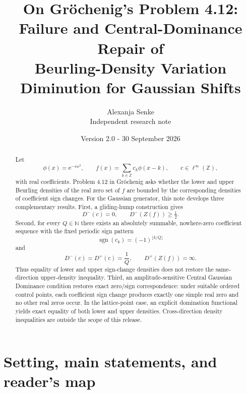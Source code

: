 \documentclass[11pt]{article}
\title{\bfseries On Gr\"ochenig's Problem 4.12:\\[0.25em]
Failure and Central-Dominance Repair of\\
Beurling-Density Variation Diminution for Gaussian Shifts}
\author{Alexanja Senke\\\small Independent research note}
\date{Version 2.0 - 30 September 2026}
\newcommand{\Z}{\mathbb{Z}}
\newcommand{\N}{\mathbb{N}}
\newcommand{\e}{\mathrm{e}}
\newcommand{\sgn}{\operatorname{sgn}}
\begin{document}
\maketitle

\begin{center}
\end{center}

\begin{abstract}
Let
\[
  \phi(x)=\e^{-\pi x^2},\qquad
  f(x)=\sum_{k\in\Z}c_k\phi(x-k),\qquad c\in\ell^\infty(\Z),
\]
with real coefficients. Problem 4.12 in Gr\"ochenig asks whether the lower and upper Beurling densities of the real zero set of $f$ are bounded by the corresponding densities of coefficient sign changes. For the Gaussian generator, this note develops three complementary results. First, a gliding-hump construction gives
\[
  D^-(c)=0,\qquad D^-(Z(f))\ge \tfrac12.
\]
Second, for every $Q\in\N$ there exists an absolutely summable, nowhere-zero coefficient sequence with the fixed periodic sign pattern
\[
  \sgn(c_k)=(-1)^{\lfloor k/Q\rfloor}
\]
and
\[
  D^-(c)=D^+(c)=\frac1Q,\qquad D^+(Z(f))=\infty.
\]
Thus equality of lower and upper sign-change densities does not restore the same-direction upper-density inequality. Third, an amplitude-sensitive Central Gaussian Dominance condition restores exact zero/sign correspondence: under suitable ordered control points, each coefficient sign change produces exactly one simple real zero and no other real zeros occur. In the lattice-point case, an explicit domination functional yields exact equality of both lower and upper densities. Cross-direction density inequalities are outside the scope of this release.
\end{abstract}

\section{Setting, main statements, and reader's map}
\end{document}
